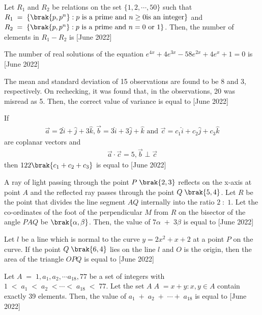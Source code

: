 \iffalse
\title{2022}
\author{EE24BTECH11063}
\section{integer}
\fi
 \item Let $R_1$ and $R_2$ be relations on the set $\{1,2,\cdots , 50\}$ such that $R_1\;=\;\{\brak{p,p^n}:p\text{ is a prime and }n\ge 0 \text{is an integer}\}$ and $R_2\;=\;\{\brak{p,p^n}:p\text{ is a prime and }n=0 \text{ or } 1\}$. Then, the number of elements in $R_1-R_2$ is \hfill{[June 2022]}
 \bigskip
 \item The number of real solutions of the equation $e^{4x}+4e^{3x}-58e^{2x}+4e^{x}+1=0$ is \hfill{[June 2022]}
 \bigskip
 \item The mean and standard deviation of 15 observations are found to be 8 and 3, respectively. On rechecking, it was found that, in the observations, 20 was misread as 5. Then, the correct value of variance is equal to \hfill{[June 2022]}
 \bigskip
 \item If
 \begin{align*}
 \overset{\rightarrow}{a}=2\hat{i}+\hat{j}+3\hat{k},\overset{\rightarrow}{b}=3\hat{i}+3\hat{j}+\hat{k}\text{ and }\overset{\rightarrow}{c}=c_1\hat{i}+c_2\hat{j}+c_3\hat{k}
 \end{align*}
 are coplanar vectors and 
 \begin{align*}
 \overset{\rightarrow}{a} \cdot \overset{\rightarrow}{c}=5, \overset{\rightarrow}{b}\perp \overset{\rightarrow}{c}
 \end{align*}
 then $122\brak{c_1+c_2+c_3}$ is equal to \hfill{[June 2022]}
 \bigskip
 \item A ray of light passing through the point $P \; \brak{2,3}$ reflects on the x-axis at point $A$ and the reflected ray passes through the point $Q\;\brak{5,4}$. Let $R$ be the point that divides the line segment $AQ$ internally into the ratio $2\;:\;1$. Let the co-ordinates of the foot of the perpendicular $M$ from $R$ on the bisector of the angle $PAQ$ be $\brak{\alpha,\beta}$. Then, the value of $7\alpha\;+\;3\beta$ is equal to \hfill{[June 2022]}
 \bigskip
 \item Let $l$ be a line which is normal to the curve $y=2x^2+x+2$ at a point $P$ on the curve. If the point $Q\;\brak{6,4}$ lies on the line $l$ and $O$ is the origin, then the area of the triangle $OPQ$ is equal to \hfill{[June 2022]}
 \bigskip
 \item Let $A\;=\;{1,a_1,a_2,\cdots a_{18},77}$ be a set of integers with $1\;<\;a_1\;<\;a_2\;<\cdots<\;a_{18}\;<\;77$. Let the set $A\;A\;={x+y:x,y \in A}$ contain exactly 39 elements. Then, the value of $a_1\;+\;a_2\;+\;\cdots+\;a_{18}$ is equal to \hfill{[June 2022]}
